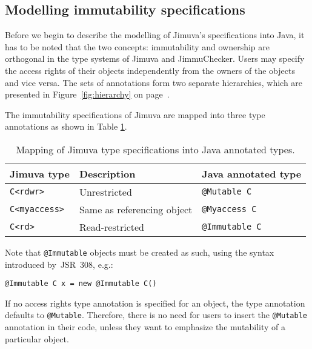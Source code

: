 \documentclass{pracamgr}
\theoremstyle{break}
\theoremstyle{break}
\theoremstyle{break}
\begin{document}
\subsection{Modelling immutability specifications}

Before we begin to describe the modelling of Jimuva's specifications
into Java, it has to be noted that the two concepts: immutability and
ownership are orthogonal in the type systems of Jimuva and
JimmuChecker. Users may specify the access rights of their objects
independently from the owners of the objects and vice versa. The sets
of annotations form two separate hierarchies, which are presented in
Figure~\ref{fig:hierarchy} on page~\pageref{fig:hierarchy}.

The immutability specifications of Jimuva are mapped into three type
annotations as shown in Table \ref{tab:mapping-immut}.

\begin{table}[htb]
  \centering
  \begin{tabular}{|l|l|l|}
    \hline
    \textbf{Jimuva type} & \textbf{Description} & \textbf{Java annotated type} \\
    \hline \hline
    \texttt{C<rdwr>} & Unrestricted & \texttt{@Mutable C} \\
    \texttt{C<myaccess>} & Same as referencing object & \texttt{@Myaccess C} \\
    \texttt{C<rd>} & Read-restricted & \texttt{@Immutable C} \\
    \hline
  \end{tabular}
  \caption{Mapping of Jimuva type specifications into Java annotated types.}
  \label{tab:mapping-immut}
\end{table}

Note that \texttt{@Immutable} objects must be created as such, using
the syntax introduced by~JSR~308, e.g.:
\begin{center}
  \texttt{@Immutable C x = new @Immutable C()}
\end{center}

If no access rights type annotation is specified for an object, the
type annotation defaults to \texttt{@Mutable}. Therefore, there is
no need for users to insert the \texttt{@Mutable} annotation in their
code, unless they want to emphasize the mutability of a particular
object.
\end{document}
